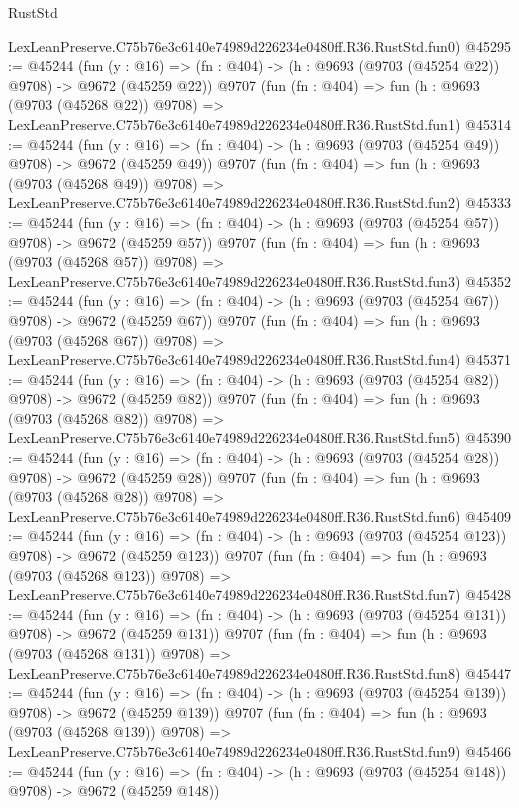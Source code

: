 \begin{lexlean}{RustStd}
\begin{coremodule}
    LexLeanPreserve.C75b76e3c6140e74989d226234e0480ff.R36.RustStd.fun0)
@45295 := @45244
    (fun (y : @16) => (fn : @404) -> (h : @9693 (@9703 (@45254 @22)) @9708) -> @9672 (@45259 @22))
    @9707
    (fun (fn : @404) =>
    fun (h : @9693 (@9703 (@45268 @22)) @9708) =>
    LexLeanPreserve.C75b76e3c6140e74989d226234e0480ff.R36.RustStd.fun1)
@45314 := @45244
    (fun (y : @16) => (fn : @404) -> (h : @9693 (@9703 (@45254 @49)) @9708) -> @9672 (@45259 @49))
    @9707
    (fun (fn : @404) =>
    fun (h : @9693 (@9703 (@45268 @49)) @9708) =>
    LexLeanPreserve.C75b76e3c6140e74989d226234e0480ff.R36.RustStd.fun2)
@45333 := @45244
    (fun (y : @16) => (fn : @404) -> (h : @9693 (@9703 (@45254 @57)) @9708) -> @9672 (@45259 @57))
    @9707
    (fun (fn : @404) =>
    fun (h : @9693 (@9703 (@45268 @57)) @9708) =>
    LexLeanPreserve.C75b76e3c6140e74989d226234e0480ff.R36.RustStd.fun3)
@45352 := @45244
    (fun (y : @16) => (fn : @404) -> (h : @9693 (@9703 (@45254 @67)) @9708) -> @9672 (@45259 @67))
    @9707
    (fun (fn : @404) =>
    fun (h : @9693 (@9703 (@45268 @67)) @9708) =>
    LexLeanPreserve.C75b76e3c6140e74989d226234e0480ff.R36.RustStd.fun4)
@45371 := @45244
    (fun (y : @16) => (fn : @404) -> (h : @9693 (@9703 (@45254 @82)) @9708) -> @9672 (@45259 @82))
    @9707
    (fun (fn : @404) =>
    fun (h : @9693 (@9703 (@45268 @82)) @9708) =>
    LexLeanPreserve.C75b76e3c6140e74989d226234e0480ff.R36.RustStd.fun5)
@45390 := @45244
    (fun (y : @16) => (fn : @404) -> (h : @9693 (@9703 (@45254 @28)) @9708) -> @9672 (@45259 @28))
    @9707
    (fun (fn : @404) =>
    fun (h : @9693 (@9703 (@45268 @28)) @9708) =>
    LexLeanPreserve.C75b76e3c6140e74989d226234e0480ff.R36.RustStd.fun6)
@45409 := @45244
    (fun (y : @16) => (fn : @404) -> (h : @9693 (@9703 (@45254 @123)) @9708) -> @9672 (@45259 @123))
    @9707
    (fun (fn : @404) =>
    fun (h : @9693 (@9703 (@45268 @123)) @9708) =>
    LexLeanPreserve.C75b76e3c6140e74989d226234e0480ff.R36.RustStd.fun7)
@45428 := @45244
    (fun (y : @16) => (fn : @404) -> (h : @9693 (@9703 (@45254 @131)) @9708) -> @9672 (@45259 @131))
    @9707
    (fun (fn : @404) =>
    fun (h : @9693 (@9703 (@45268 @131)) @9708) =>
    LexLeanPreserve.C75b76e3c6140e74989d226234e0480ff.R36.RustStd.fun8)
@45447 := @45244
    (fun (y : @16) => (fn : @404) -> (h : @9693 (@9703 (@45254 @139)) @9708) -> @9672 (@45259 @139))
    @9707
    (fun (fn : @404) =>
    fun (h : @9693 (@9703 (@45268 @139)) @9708) =>
    LexLeanPreserve.C75b76e3c6140e74989d226234e0480ff.R36.RustStd.fun9)
@45466 := @45244
    (fun (y : @16) => (fn : @404) -> (h : @9693 (@9703 (@45254 @148)) @9708) -> @9672 (@45259 @148))

\end{coremodule}
\end{lexlean}
